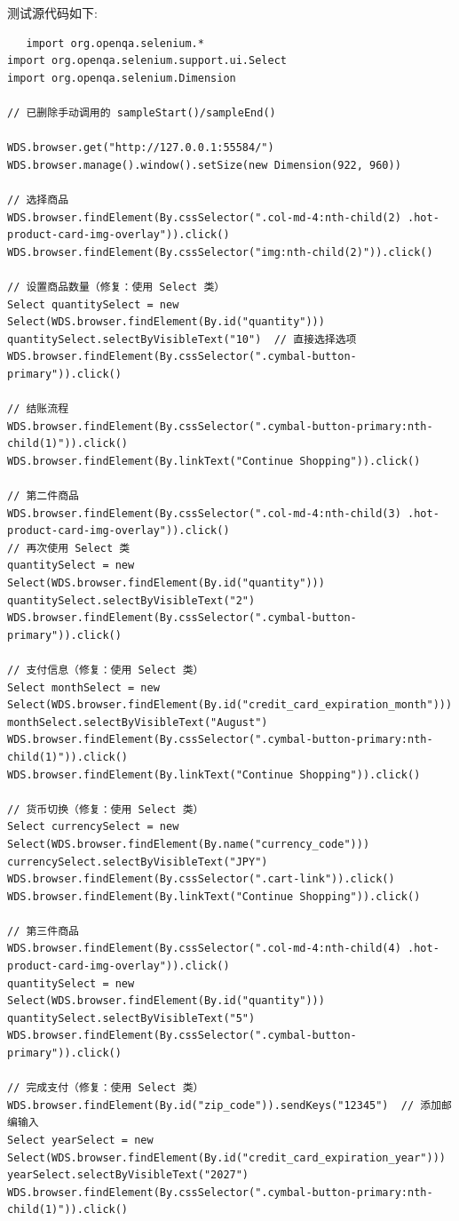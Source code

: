 \documentclass[hyperref,a4paper,UTF8]{ctexart}
\begin{document}
测试源代码如下:
\begin{lstlisting}
   import org.openqa.selenium.*
import org.openqa.selenium.support.ui.Select
import org.openqa.selenium.Dimension

// 已删除手动调用的 sampleStart()/sampleEnd()

WDS.browser.get("http://127.0.0.1:55584/")
WDS.browser.manage().window().setSize(new Dimension(922, 960))

// 选择商品
WDS.browser.findElement(By.cssSelector(".col-md-4:nth-child(2) .hot-product-card-img-overlay")).click()
WDS.browser.findElement(By.cssSelector("img:nth-child(2)")).click()

// 设置商品数量（修复：使用 Select 类）
Select quantitySelect = new Select(WDS.browser.findElement(By.id("quantity")))
quantitySelect.selectByVisibleText("10")  // 直接选择选项
WDS.browser.findElement(By.cssSelector(".cymbal-button-primary")).click()

// 结账流程
WDS.browser.findElement(By.cssSelector(".cymbal-button-primary:nth-child(1)")).click()
WDS.browser.findElement(By.linkText("Continue Shopping")).click()

// 第二件商品
WDS.browser.findElement(By.cssSelector(".col-md-4:nth-child(3) .hot-product-card-img-overlay")).click()
// 再次使用 Select 类
quantitySelect = new Select(WDS.browser.findElement(By.id("quantity")))
quantitySelect.selectByVisibleText("2")
WDS.browser.findElement(By.cssSelector(".cymbal-button-primary")).click()

// 支付信息（修复：使用 Select 类）
Select monthSelect = new Select(WDS.browser.findElement(By.id("credit_card_expiration_month")))
monthSelect.selectByVisibleText("August")
WDS.browser.findElement(By.cssSelector(".cymbal-button-primary:nth-child(1)")).click()
WDS.browser.findElement(By.linkText("Continue Shopping")).click()

// 货币切换（修复：使用 Select 类）
Select currencySelect = new Select(WDS.browser.findElement(By.name("currency_code")))
currencySelect.selectByVisibleText("JPY")
WDS.browser.findElement(By.cssSelector(".cart-link")).click()
WDS.browser.findElement(By.linkText("Continue Shopping")).click()

// 第三件商品
WDS.browser.findElement(By.cssSelector(".col-md-4:nth-child(4) .hot-product-card-img-overlay")).click()
quantitySelect = new Select(WDS.browser.findElement(By.id("quantity")))
quantitySelect.selectByVisibleText("5")
WDS.browser.findElement(By.cssSelector(".cymbal-button-primary")).click()

// 完成支付（修复：使用 Select 类）
WDS.browser.findElement(By.id("zip_code")).sendKeys("12345")  // 添加邮编输入
Select yearSelect = new Select(WDS.browser.findElement(By.id("credit_card_expiration_year")))
yearSelect.selectByVisibleText("2027")
WDS.browser.findElement(By.cssSelector(".cymbal-button-primary:nth-child(1)")).click()
  
\end{lstlisting}
\end{document}
